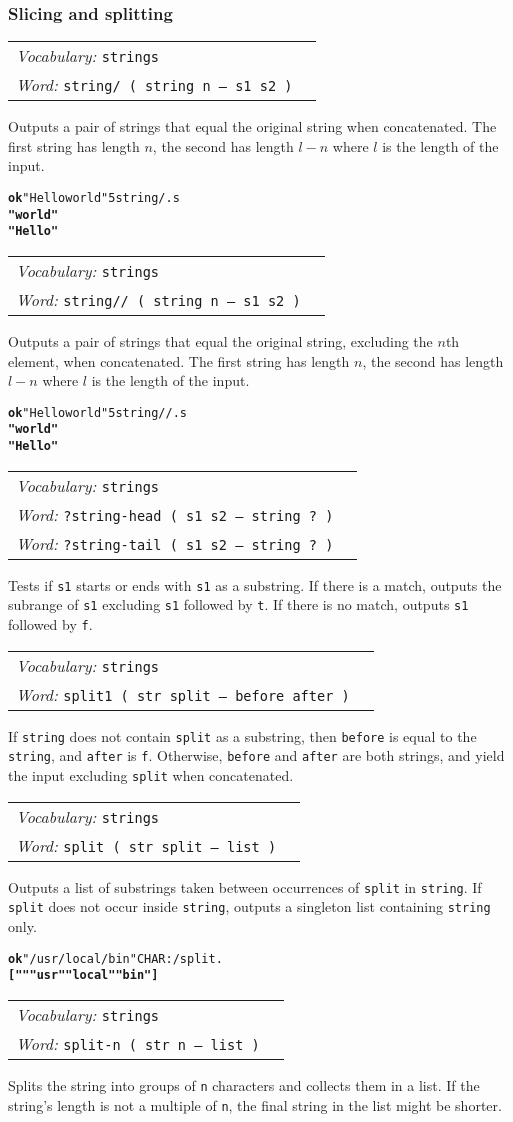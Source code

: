 \documentclass{book}
\newcommand{\vocabulary}[1]{\emph{Vocabulary:} \texttt{#1}&\\}
\newcommand{\ordinaryword}[2]{\index{\texttt{#1}}\emph{Word:} \texttt{#2}&\\}
\newcommand{\wordtable}[1]{

\begin{tabularx}{12cm}[t]{lX}
\hline
#1
\hline
\end{tabularx}

}
\begin{document}
\subsubsection{Slicing and splitting}

\wordtable{
\vocabulary{strings}
\ordinaryword{string/}{string/ ( string n -- s1 s2 )}
}
Outputs a pair of strings that equal the original string when concatenated. The first string has length $n$, the second has length $l-n$ where $l$ is the length of the input.
\begin{alltt}
\textbf{ok} "Hello world" 5 string/ .s
\textbf{" world"
"Hello"}
\end{alltt}
\wordtable{
\vocabulary{strings}
\ordinaryword{string//}{string// ( string n -- s1 s2 )}
}

Outputs a pair of strings that equal the original string, excluding the $n$th element, when concatenated. The first string has length $n$, the second has length $l-n$ where $l$ is the length of the input.
\begin{alltt}
\textbf{ok} "Hello world" 5 string// .s
\textbf{"world"
"Hello"}
\end{alltt}
\wordtable{
\vocabulary{strings}
\ordinaryword{?string-head}{?string-head~( s1 s2 -- string ?~)}
\ordinaryword{?string-tail}{?string-tail~( s1 s2 -- string ?~)}
}
Tests if \texttt{s1} starts or ends with \texttt{s1} as a substring. If there is a match, outputs the subrange of \texttt{s1} excluding \texttt{s1} followed by \texttt{t}. If there is no match, outputs \texttt{s1} followed by \texttt{f}.
\wordtable{
\vocabulary{strings}
\ordinaryword{split1}{split1~( str split -- before after )}

}
If \texttt{string} does not contain \texttt{split} as a substring, then \texttt{before} is equal to the \texttt{string}, and \texttt{after} is \texttt{f}. Otherwise, \texttt{before} and \texttt{after} are both strings, and yield the input excluding \texttt{split} when concatenated.
\wordtable{
\vocabulary{strings}
\ordinaryword{split}{split~( str split -- list )}
}
Outputs a list of substrings taken between occurrences of \texttt{split} in \texttt{string}. If \texttt{split} does not occur inside \texttt{string}, outputs a singleton list containing \texttt{string} only.
\begin{alltt}
\textbf{ok} "/usr/local/bin" CHAR: / split .
\textbf{[ "" "usr" "local" "bin" ]}
\end{alltt}
\wordtable{
\vocabulary{strings}
\ordinaryword{split-n}{split-n~( str n -- list )}
}
Splits the string into groups of \texttt{n} characters and collects them in a list. If the string's length is not a multiple of \texttt{n}, the final string in the list might be shorter.
\end{document}
